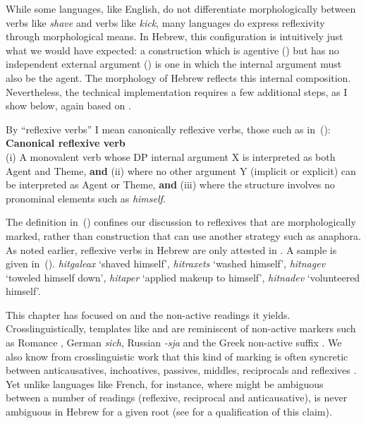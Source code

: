While some languages, like English, do not differentiate morphologically between verbs like \emph{shave} and verbs like \emph{kick}, many languages do express reflexivity through morphological means. In Hebrew, this configuration is intuitively just what we would have expected: a construction which is agentive (\va) but has no independent external argument (\vz) is one in which the internal argument must also be the agent. The morphology of Hebrew reflects this internal composition. Nevertheless, the technical implementation requires a few additional steps, as I show below, again based on \citep{kastner17gjgl}.


By ``reflexive verbs'' I mean canonically reflexive verbs, those such as in~(\nextx):
\ex \textbf{Canonical reflexive verb}\\
	(i) A monovalent verb whose DP internal argument X is interpreted as both Agent and Theme, \textbf{and} (ii) where no other argument Y (implicit or explicit) can be interpreted as Agent or Theme, \textbf{and} (iii) where the structure involves no pronominal elements such as \emph{himself}.
\xe

The definition in~(\lastx) confines our discussion to reflexives that are morphologically marked, rather than construction that can use another strategy such as anaphora. As noted earlier, reflexive verbs in Hebrew are only attested in \thit. A sample is given in~(\nextx).
\ex\label{ex:refl}\emph{hitgaleax} `shaved himself', \emph{hitraxets} `washed himself', \emph{hitnagev} `toweled himself down', \emph{hitaper} `applied makeup to himself', \emph{hitnadev} `volunteered himself'.
\xe

This chapter has focused on {\vz} and the non-active readings it yields. Crosslinguistically, templates like {\tnif} and {\thit} are reminiscent of non-active markers such as Romance , German \emph{sich}, Russian \emph{-sja} and the Greek non-active suffix . We also know from crosslinguistic work that this kind of marking is often syncretic between anticausatives, inchoatives, passives, middles, reciprocals and reflexives \citep{geniusiene87,klaiman91,alexiadoudoron12}. Yet unlike languages like French, for instance, where  might be ambiguous between a number of readings (reflexive, reciprocal and anticausative), {\thit} is never ambiguous in Hebrew for a given root (see \citealt{kastner17gjgl} for a qualification of this claim).

